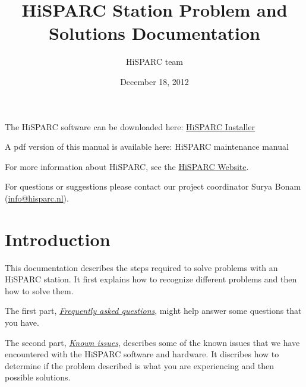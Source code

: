 \documentclass[a4paper,11pt,english]{sphinxmanual}
\title{HiSPARC Station Problem and Solutions Documentation}
\date{December 18, 2012}
\author{HiSPARC team}
\begin{document}
\maketitle
\tableofcontents
{}\label{index::doc}


The HiSPARC software can be downloaded here: \href{http://www.hisparc.nl/downloads/software/}{HiSPARC Installer}

A pdf version of this manual is available here: HiSPARC maintenance manual

For more information about HiSPARC, see the \href{http://www.hisparc.nl/}{HiSPARC Website}.

For questions or suggestions please contact our project coordinator
Surya Bonam (\href{mailto:info@hisparc.nl}{info@hisparc.nl}).


\chapter{Introduction}
\label{introduction:introduction}\label{introduction::doc}\label{introduction:welcome-to-the-hisparc-maintenance-documentation}
This documentation describes the steps required to solve problems with an HiSPARC station.  It first explains how to recognize different problems and then how to solve them.

The first part, {\hyperref[faq::doc]{\emph{Frequently asked questions}}}, might help answer some questions that you have.

The second part, {\hyperref[known-issues::doc]{\emph{Known issues}}}, describes some of the known issues that we have encountered with the HiSPARC software and hardware. It discribes how to determine if the problem described is what you are experiencing and then possible solutions.
\end{document}

